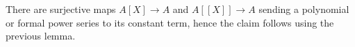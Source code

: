 There are surjective maps $A[X]\to A$ and  $A[[X]]\to A$ sending a polynomial
or formal power series to its constant term, hence the claim follows using the
previous lemma.

